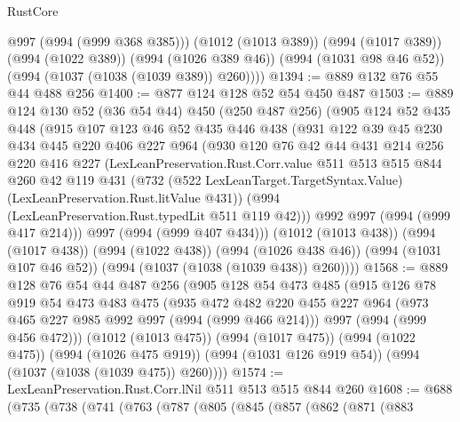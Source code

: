 \begin{lexlean}{RustCore}
\begin{coremodule}
          @997
          (@994 (@999 @368 @385)))
        (@1012 (@1013 @389))
        (@994 (@1017 @389))
        (@994 (@1022 @389))
        (@994 (@1026 @389 @46))
        (@994 (@1031 @98 @46 @52))
        (@994 (@1037 (@1038 (@1039 @389)) @260))))
@1394 := @889 @132 @76 @55 @44 @488 @256
@1400 := @877 @124 @128 @52 @54 @450 @487
@1503 := @889
    @124
    @130
    @52
    (@36 @54 @44)
    @450
    (@250 @487 @256)
    (@905
      @124
      @52
      @435
      @448
      (@915
        @107
        @123
        @46
        @52
        @435
        @446
        @438
        (@931
          @122
          @39
          @45
          @230
          @434
          @445
          @220
          @406
          @227
          @964
          (@930
            @120
            @76
            @42
            @44
            @431
            @214
            @256
            @220
            @416
            @227
            (LexLeanPreservation.Rust.Corr.value
              @511
              @513
              @515
              @844
              @260
              @42
              @119
              @431
              (@732
                (@522 LexLeanTarget.TargetSyntax.Value)
                (LexLeanPreservation.Rust.litValue @431))
              (@994 (LexLeanPreservation.Rust.typedLit @511 @119 @42)))
            @992
            @997
            (@994 (@999 @417 @214)))
          @997
          (@994 (@999 @407 @434)))
        (@1012 (@1013 @438))
        (@994 (@1017 @438))
        (@994 (@1022 @438))
        (@994 (@1026 @438 @46))
        (@994 (@1031 @107 @46 @52))
        (@994 (@1037 (@1038 (@1039 @438)) @260))))
@1568 := @889
    @128
    @76
    @54
    @44
    @487
    @256
    (@905
      @128
      @54
      @473
      @485
      (@915
        @126
        @78
        @919
        @54
        @473
        @483
        @475
        (@935
          @472
          @482
          @220
          @455
          @227
          @964
          (@973 @465 @227 @985 @992 @997 (@994 (@999 @466 @214)))
          @997
          (@994 (@999 @456 @472)))
        (@1012 (@1013 @475))
        (@994 (@1017 @475))
        (@994 (@1022 @475))
        (@994 (@1026 @475 @919))
        (@994 (@1031 @126 @919 @54))
        (@994 (@1037 (@1038 (@1039 @475)) @260))))
@1574 := LexLeanPreservation.Rust.Corr.lNil @511 @513 @515 @844 @260
@1608 := @688
    (@735
      (@738
        (@741
          (@763
            (@787
              (@805
                (@845
                  (@857
                    (@862
                      (@871
                        (@883

\end{coremodule}
\end{lexlean}
